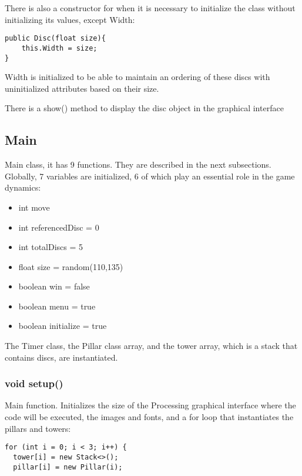 \documentclass[
	12pt,				%
	oneside,			%
	a4paper,			%
	english,			%
	brazil,				%
	]{abntex2}
\begin{document}
{There is also a constructor for when it is necessary to initialize the class without initializing its values, except Width:

\begin{itshape}
\begin{verbatim}
public Disc(float size){
    this.Width = size;
}
\end{verbatim}
\end{itshape}
Width is initialized to be able to maintain an ordering of these discs with uninitialized attributes based on their size.

There is a show() method to display the disc object in the graphical interface

\subsection{Main}
Main class, it has 9 functions. They are described in the next subsections. Globally, 7 variables are initialized, 6 of which play an essential role in the game dynamics:

\begin{itemize}
    \item int move
    \item int referencedDisc = 0
    \item int totalDiscs = 5
    \item float size = random(110,135)
    \item boolean win = false
    \item boolean menu = true
    \item boolean initialize = true
    \end{itemize}

The Timer class, the Pillar class array, and the tower array, which is a stack that contains discs, are instantiated.
\subsubsection{void setup()}
Main function. Initializes the size of the Processing graphical interface where the code will be executed, the images and fonts, and a for loop that instantiates the pillars and towers:

\begin{itshape}
\begin{verbatim}
for (int i = 0; i < 3; i++) {
  tower[i] = new Stack<>();
  pillar[i] = new Pillar(i);
\end{verbatim}
\end{itshape}
}
\end{document}

